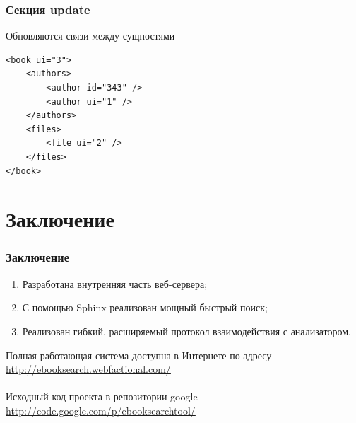 \documentclass[utf8,handout]{beamer}
\begin{document}
		\begin{frame}[fragile]
 			\frametitle{Секция update}
 			Обновляются связи между сущностями
 			\begin{block}{}
	 			\begin{verbatim}
<book ui="3">
    <authors>
        <author id="343" />
        <author ui="1" />
    </authors>
    <files>
        <file ui="2" />
    </files>
</book>

				\end{verbatim}
			\end{block} 			
		\end{frame}
	
\section{Заключение}
	\begin{frame}
		\frametitle{Заключение}
		\begin{block}{}
			\begin{enumerate}
				\item Разработана внутренняя часть веб-сервера;
				\item С помощью Sphinx реализован мощный быстрый поиск;
				\item Реализован гибкий, расширяемый протокол взаимодействия с анализатором.
			\end{enumerate}
		\end{block}
		\begin{block}{}
		Полная работающая система доступна в Интернете по адресу\\ \url{http://ebooksearch.webfactional.com/} \\
		~\\
		Исходный код проекта в репозитории google\\ \url{http://code.google.com/p/ebooksearchtool/}
		\end{block}
	\end{frame}
	
\end{document}

